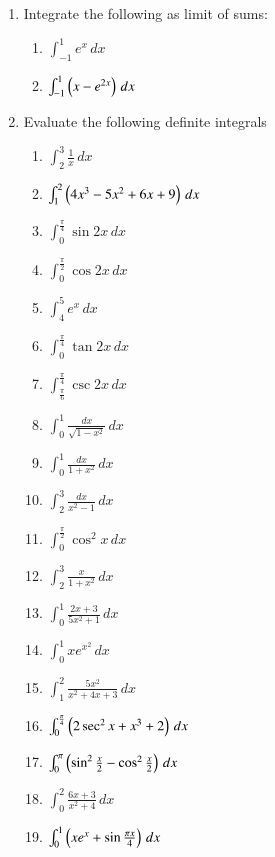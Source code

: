 \begin{enumerate}[label=\arabic*.,ref=\thesubsection.\theenumi]
%
\item Integrate the following as limit of sums:
\begin{enumerate}[label = (\roman*)]
\item $\int_{-1}^{1}e^x\, dx$
\item $\int_{-1}^{1}\left(x-e^{2x}\right)\, dx$
\end{enumerate}
%
\item Evaluate the following definite integrals
%
\begin{enumerate}[label = (\roman*)]
\item $\int_{2}^{3}\frac{1}{x}\, dx$
\item $\int_{1}^{2}\left(4x^3-5x^2+6x+9\right) \, dx$
\item $\int_{0}^{\frac{\pi}{4}}\sin 2x\, dx$
\item $\int_{0}^{\frac{\pi}{2}}\cos 2x\, dx$
\item $\int_{4}^{5}e^{x}\, dx$
\item $\int_{0}^{\frac{\pi}{4}}\tan 2x\, dx$
\item $\int_{\frac{\pi}{6}}^{\frac{\pi}{4}}\csc 2x\, dx$
\item $\int_{0}^{1}\frac{dx}{\sqrt{1-x^2}}\, dx$
\item $\int_{0}^{1}\frac{dx}{1+x^2}\, dx$
\item $\int_{2}^{3}\frac{dx}{x^2-1}\, dx$
\item $\int_{0}^{\frac{\pi}{2}}\cos^2 x\, dx$
\item $\int_{2}^{3}\frac{x}{1+x^2}\, dx$
\item $\int_{0}^{1}\frac{2x+3}{5x^2+1}\, dx$
\item $\int_{0}^{1}xe^{x^2}\, dx$
\item $\int_{1}^{2}\frac{5x^2}{x^2+4x+3}\, dx$
\item $\int_{0}^{\frac{\pi}{4}}\left(2\sec^2 x + x^3+2\right)\, dx$
\item $\int_{0}^{\pi}\left(\sin^2\frac{x}{2}-\cos^2\frac{x}{2}\right)\, dx$
\item $\int_{0}^{2}\frac{6x+3}{x^2+4}\, dx$
\item $\int_{0}^{1}\left(xe^{x}+\sin\frac{\pi x}{4}\right)\, dx$
\end{enumerate}

\end{enumerate}
